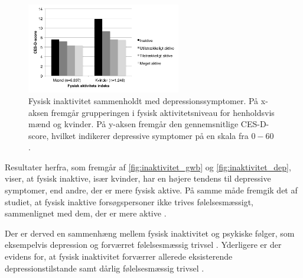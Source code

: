 \begin{figure}[H]
\centering
\includegraphics[width=0.6\textwidth]{figures/inaktivitet_dep}
\caption{Fysisk inaktivitet sammenholdt med depressionssymptomer. På x-aksen fremgår grupperingen i fysisk aktivitetsniveau for henholdsvis mænd og kvinder. På y-aksen fremgår den gennemsnitlige CES-D-score, hvilket indikerer depressive symptomer på en skala fra $0-60$ \citep{galper2006}.}
\label{fig:inaktivitet_dep}
\end{figure}

\noindent
Resultater herfra, som fremgår af \autoref{fig:inaktivitet_gwb} og \autoref{fig:inaktivitet_dep}, viser, at fysisk inaktive, især kvinder, har en højere tendens til depressive symptomer, end andre, der er mere fysisk aktive. På samme måde fremgik det af studiet, at fysisk inaktive forsøgspersoner  ikke trives følelsesmæssigt, sammenlignet med dem, der er mere aktive \citep{galper2006}. 

Der er derved en sammenhæng mellem fysisk inaktivitet og psykiske følger, som eksempelvis depression og forværret følelsesmæssig trivsel \citep{galper2006}. Yderligere er der evidens for, at fysisk inaktivitet forværrer allerede eksisterende depressionstilstande samt dårlig følelsesmæssig trivsel \citep{motionsraad2007}.
